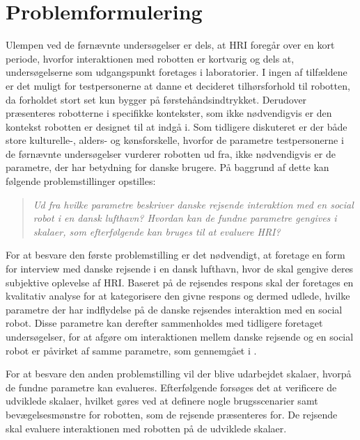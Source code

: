 \section{Problemformulering}
\label{Problemformulering}
%
Ulempen ved de førnævnte undersøgelser er dels, at HRI foregår over en kort periode, hvorfor interaktionen med robotten er kortvarig og dels at, undersøgelserne som udgangspunkt foretages i laboratorier. I ingen af tilfældene er det muligt for testpersonerne at danne et decideret tilhørsforhold til robotten, da forholdet stort set kun bygger på førstehåndsindtrykket. Derudover præsenteres robotterne i specifikke kontekster, som ikke nødvendigvis er den kontekst robotten er designet til at indgå i. Som tidligere diskuteret er der både store kulturelle-, alders- og kønsforskelle, hvorfor de parametre testpersonerne i de førnævnte undersøgelser vurderer robotten ud fra, ikke nødvendigvis er de parametre, der har betydning for danske brugere. På baggrund af dette kan følgende problemstillinger opstilles:\blankline
%
\begin{quotation}
	\noindent
	\textit{Ud fra hvilke parametre beskriver danske rejsende interaktion med en social robot i en dansk lufthavn?\blankline
		Hvordan kan de fundne parametre gengives i skalaer, som efterfølgende kan bruges til at evaluere HRI?}\blankline
\end{quotation}
%
For at besvare den første problemstilling er det nødvendigt, at foretage en form for interview med danske rejsende i en dansk lufthavn, hvor de skal gengive deres subjektive oplevelse af HRI. Baseret på de rejsendes respons skal der foretages en kvalitativ analyse for at kategorisere den givne respons og dermed udlede, hvilke parametre der har indflydelse på de danske rejsendes interaktion med en social robot. Disse parametre kan derefter sammenholdes med tidligere foretaget undersøgelser, for at afgøre om interaktionen mellem danske rejsende og en social robot er påvirket af samme parametre, som gennemgået i . 

For at besvare den anden problemstilling vil der blive udarbejdet skalaer, hvorpå de fundne parametre kan evalueres. Efterfølgende forsøges det at verificere de udviklede skalaer, hvilket gøres ved at definere nogle brugsscenarier samt bevægelsesmønstre for robotten, som de rejsende præsenteres for. De rejsende skal evaluere interaktionen med robotten på de udviklede skalaer.


